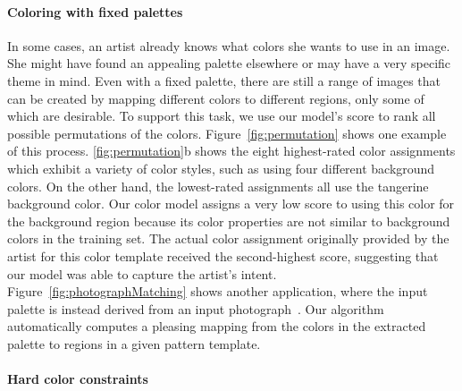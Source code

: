 \paragraph{Coloring with fixed palettes} In some cases, an artist already knows what colors she wants to use in an image. She might have found an appealing palette elsewhere or may have a very specific theme in mind. Even with a fixed palette, there are still a range of images that can be created by mapping different colors to different regions, only some of which are desirable. To support this task, we use our model's score to rank all possible permutations of the colors. Figure~\ref{fig:permutation} shows one example of this process. \ref{fig:permutation}b shows the eight highest-rated color assignments which exhibit a variety of color styles, such as using four different background colors. On the other hand, the lowest-rated assignments all use the tangerine background color. Our color model assigns a very low score to using this color for the background region because its color properties are not similar to background colors in the training set. The actual color assignment originally provided by the artist for this color template received the second-highest score, suggesting that our model was able to capture the artist's intent. Figure~\ref{fig:photographMatching} shows another application, where the input palette is instead derived from an input photograph~\cite{SharonPaletteExtraction}. Our algorithm automatically computes a pleasing mapping from the colors in the extracted palette to regions in a given pattern template.

\paragraph{Hard color constraints}

